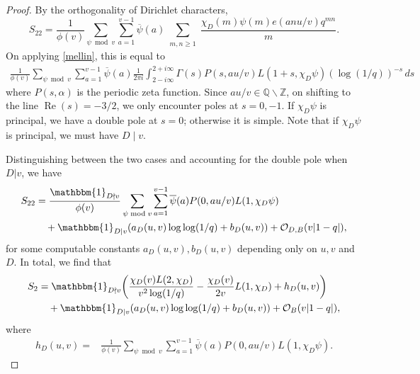 \documentclass[10pt,a4paper]{amsart}
\newtheorem{comment}{Comment}
\newcommand{\mb}{\mathbb}
\begin{document}
\begin{proof}
By the orthogonality of Dirichlet characters, 
\[
S_{22}
=
\frac{1}{\phi(v)}\sum_{\psi \bmod v} \sum_{a=1}^{v-1}\overline{\psi}(a)\sum_{\substack{m,n\geq 1}}
 \frac{\chi_D(m)\psi(m)e(anu/v)q^{mn}}{m}.
\]
On applying \eqref{mellin}, this is equal to
\begin{align}\label{Eq: Double Pole}
\frac{1}{\phi(v)}\sum_{\psi \bmod v} \sum_{a=1}^{v-1}\overline{\psi}(a)
\frac{1}{2\pi i }\int_{2-i\infty}^{2+i\infty}
\Gamma(s)P(s,au/v)L(1+s,\chi_D\psi)(\log(1/q))^{-s}\, ds
\end{align}
where $P(s,\alpha)$ is the periodic zeta function. Since $au/v\in \mb{Q}\backslash\mb{Z}$, on shifting to the line $\operatorname{Re}(s)=-3/2$, we only encounter poles at $s=0,-1$. If $\chi_D\psi$ is principal, we have a double pole at $s=0$; otherwise it is simple. Note that if $\chi_D\psi$ is principal, we must have $D \mid v$. 

Distinguishing between the two cases and accounting for the double pole when $D|v$, we have
\begin{align*}
S_{22}& =
\frac{\mathbbm{1}_{D\nmid v}}{\phi(v)}\sum_{\psi \bmod v} \sum_{a=1}^{v-1}\overline{\psi}(a)P(0,au/v)L(1,\chi_D\psi)
\\
&\quad +
\mathbbm{1}_{D| v}(a_D(u,v)\log\log(1/q)+b_D(u,v))
+
\mathcal{O}_{D,B}(v|1-q|),
\end{align*}
for some computable constants $a_D(u,v),b_D(u,v)$ depending only on $u,v$ and $D$. In total, we  find that 
\begin{align}\label{S2}
S_2
&=
\mathbbm{1}_{D\nmid v} \bigg(\frac{\chi_D(v)L(2,\chi_D)}{v^2\log(1/q)}
-\frac{\chi_D(v)}{2v}
L(1,\chi_D)
+
h_D(u,v)\bigg) \notag\\
&\quad +
\mathbbm{1}_{D| v}(a_D(u,v)\log\log(1/q)+b_D(u,v))
+\mathcal{O}_B(v|1-q|),
\end{align}
where 
\begin{align*}
h_D(u,v)
= &
\frac{1}{\phi(v)}\sum_{\psi \bmod v} \sum_{a=1}^{v-1}\overline{\psi}(a)P(0,au/v)L(1,\chi_D\psi).
\end{align*}


\end{proof}
\end{document}
